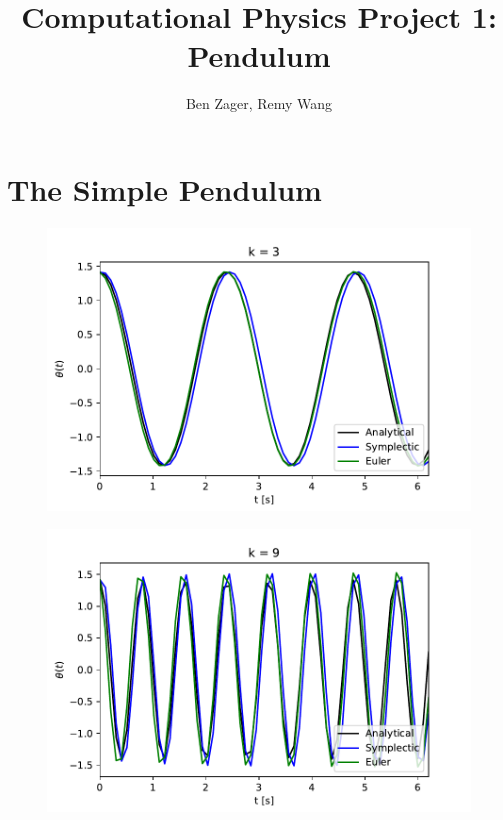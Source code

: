\documentclass[12pt]{article}
\begin{document}
  
\title{Computational Physics Project 1: Pendulum}
\author{Ben Zager, Remy Wang}
\maketitle
 
\section*{The Simple Pendulum}

\noindent
\begin{figure}[ht!]
	\centering
	\begin{minipage}[b]{0.4\textwidth}
	  \includegraphics[scale=0.6]{../figures/k3_nonlin.pdf}
		\label{phaseDot}
	\end{minipage}
	\hfill
	\begin{minipage}[b]{0.4\textwidth}
	  \includegraphics[scale=0.6]{../figures/k9_nonlin.pdf}

\end{minipage}
\end{figure}
\end{document}

